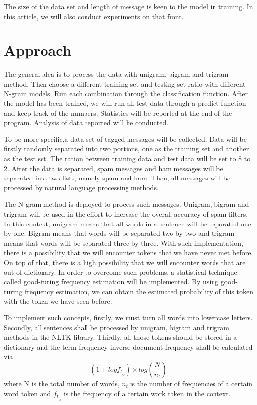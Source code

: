 \documentclass{article}
\begin{document}
The size of the data set and length of message is keen to the model in training. In this article, we will also conduct experiments on that front. 
\section{Approach}
The general idea is to process the data with unigram, bigram and trigram method. Then choose a different training set and testing set ratio with different N-gram models. Run each combination through the classification function. After the model has been trained, we will run all test data through a predict function and keep track of the numbers. Statistics will be reported at the end of the program. Analysis of data reported will be conducted. 

To be more specific,a data set of tagged messages will be collected. Data will be firstly randomly separated into two portions, one as the training set and another as the test set. The ration between training data and test data will be set to 8 to 2. After the data is separated, spam messages and ham messages will be separated into two lists, namely spam and ham. Then, all messages will be processed by natural language processing methods. 


The N-gram method is deployed to process such messages. Unigram, bigram and trigram will be used in the effort to increase the overall accuracy of spam filters. In this context, unigram means that all words in a sentence will be separated one by one. Bigram means that words will be separated two by two and trigram means that words will be separated three by three. With such implementation, there is a possibility that we will encounter tokens that we have never met before. On top of that, there is a high possibility that we will encounter words that are out of dictionary. In order to overcome such problems, a statistical technique called good-turing frequency estimation will be implemented. By using good-turing frequency estimation, we can obtain the estimated probability of this token with the token we have seen before\cite{Avasthi}. 


To implement such concepts, firstly, we must turn all words into lowercase letters. Secondly, all sentences shall be processed by unigram, bigram and trigram methods in the NLTK library. Thirdly, all those tokens should be stored in a dictionary and the term frequency-inverse document frequency shall be calculated via 
\[(1+log f_t_,_d)\times log(\frac{N}{n_t})\]
where N is the total number of words, \(n_t\) is the number of frequencies of a certain word token and \(f_t_,_q\) is the frequency of a certain work token in the context. 
\end{document}

